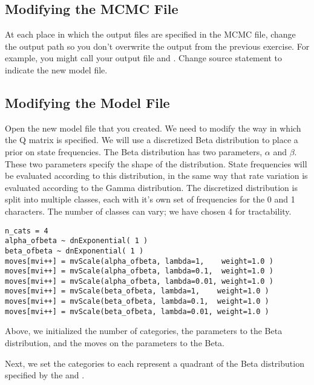 \subsection{Modifying the MCMC File}

At each place in which the output files are specified in the MCMC file, change the output path so you don't overwrite the output from the previous exercise. 
For example, you might call your output file  and .
Change source statement to indicate the new model file.

\subsection{Modifying the Model File}

Open the new model file that you created. We need to modify the way in which the Q matrix is specified. 
We will use a discretized Beta distribution to place a prior on state frequencies. 
The Beta distribution has two parameters, $\alpha$ and $\beta$.
These two parameters specify the shape of the distribution.
State frequencies will be evaluated according to this distribution, in the same way that rate variation is evaluated according to the Gamma distribution. 
The discretized distribution is split into multiple classes, each with it's own set of frequencies for the 0 and 1 characters.
The number of classes can vary; we have chosen 4 for tractability.\par

{\tt \begin{snugshade*}
\begin{lstlisting}
n_cats = 4
alpha_ofbeta ~ dnExponential( 1 )
beta_ofbeta ~ dnExponential( 1 )
moves[mvi++] = mvScale(alpha_ofbeta, lambda=1,    weight=1.0 )
moves[mvi++] = mvScale(alpha_ofbeta, lambda=0.1,  weight=1.0 )
moves[mvi++] = mvScale(alpha_ofbeta, lambda=0.01, weight=1.0 )
moves[mvi++] = mvScale(beta_ofbeta, lambda=1,    weight=1.0 )
moves[mvi++] = mvScale(beta_ofbeta, lambda=0.1,  weight=1.0 )
moves[mvi++] = mvScale(beta_ofbeta, lambda=0.01, weight=1.0 )
\end{lstlisting}
\end{snugshade*}}

Above, we initialized the number of categories,  the parameters to the Beta distribution, and the moves on the parameters to the Beta. 

Next, we set the categories to each represent a quadrant of the Beta distribution specified by the  and .


